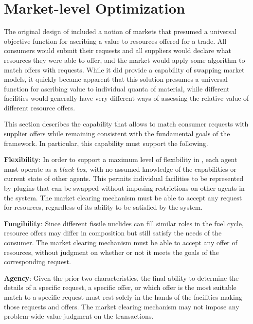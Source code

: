 \section{Market-level Optimization}\label{section:market}

The original design of \Cyclus included a notion of markets that presumed a
universal objective function for ascribing a value to resources offered for a
trade.  All consumers would submit their requests and all suppliers would
declare what resources they were able to offer, and the market would apply
some algorithm to match offers with requests.  While it did provide a
capability of swapping market models, it quickly became apparent that this
solution presumes a universal function for ascribing value to individual
quanta of material, while different facilities would generally have very
different ways of assessing the relative value of different resource offers.

This section describes the capability that allows \Cyclus to match consumer
requests with supplier offers while remaining consistent with the fundamental
goals of the \Cyclus framework.  In particular, this capability must support
the following.

\vspace{1em}
\noindent\textbf{Flexibility}: In order to support a maximum level of
flexibility in \Cyclus, each agent must operate as a \textit{black box}, with
no assumed knowledge of the capabilities or current state of other agents.
This permits individual facilities to be represented by plugins that can be
swapped without imposing restrictions on other agents in the system.  The
market clearing mechanism must be able to accept any request for resources,
regardless of its ability to be satisfied by the system.

\vspace{1em}
\noindent\textbf{Fungibility}: Since different fissile nuclides can fill
similar roles in the fuel cycle, resource offers may differ in composition but
still satisfy the needs of the consumer.  The market clearing mechanism must
be able to accept any offer of resources, without judgment on whether or not
it meets the goals of the corresponding request.

\vspace{1em}
\noindent\textbf{Agency}: Given the prior two characteristics, the final
ability to determine the details of a specific request, a specific offer, or
which offer is the most suitable match to a specific request must rest solely
in the hands of the facilities making those requests and offers.  The market
clearing mechanism may not impose any problem-wide value judgment on the
transactions.
\vspace{1em}

